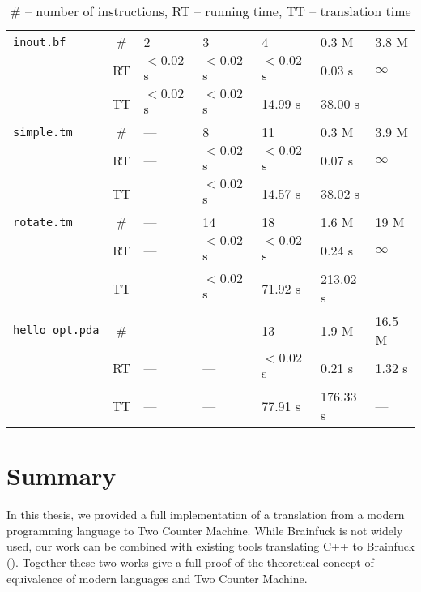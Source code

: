 \documentclass[english,shortabstract,mgr]{iithesis}
\begin{document}
\begin{table}[]
\begin{center}
\begin{tabular}{
  L{2.6cm}c|R{1.7cm}R{1.7cm}R{1.7cm}R{1.7cm}R{1.7cm}
}
\hline
\texttt{inout.bf} & \# & 2 & 3 & 4 & 0.3 M & 3.8 M\\
 & {\footnotesize{RT}} & $<0.02$ s & $<0.02$ s & $<0.02$ s & 0.03 s & $\infty$ \\
 & {\footnotesize{TT}} & $<0.02$ s & $<0.02$ s & 14.99 s & 38.00 s & --- \\
\hline
\texttt{simple.tm} & \# & --- & 8 & 11 & 0.3 M & 3.9 M\\
 & {\footnotesize{RT}} & --- & $<0.02$ s & $<0.02$ s & 0.07 s & $\infty$ \\
 & {\footnotesize{TT}} & --- & $<0.02$ s & 14.57 s & 38.02 s & --- \\
\hline
\texttt{rotate.tm} & \# & --- & 14 & 18 & 1.6 M & 19 M\\
 & {\footnotesize{RT}} & --- & $<0.02$ s & $<0.02$ s & 0.24 s & $\infty$ \\
 & {\footnotesize{TT}} & --- & $<0.02$ s & 71.92 s & 213.02 s & --- \\
\hline
\texttt{hello\_opt.pda} & \# & --- & --- & 13 & 1.9 M & 16.5 M\\
 & {\footnotesize{RT}} & --- & --- & $<0.02$ s & 0.21 s & 1.32 s \\
 & {\footnotesize{TT}} & --- & --- & 77.91 s & 176.33 s & --- \\
\end{tabular}
\centering
\caption{
\# -- number of instructions, RT -- running time, TT -- translation time
}
\label{t:summary}
\end{center}
\end{table}


\chapter{Summary}

In this thesis, we provided a full implementation of a translation
from a modern programming language to Two Counter Machine. 
While Brainfuck is not widely used, our work can be combined with 
existing tools translating C++
to Brainfuck (\hspace{1sp}\cite{in-person}). Together these two works give a full
proof of the theoretical concept of equivalence of modern languages and Two Counter
Machine.
\end{document}
